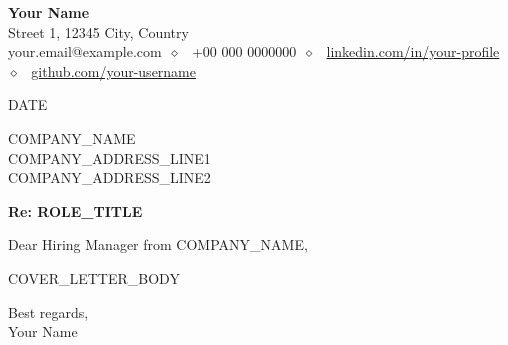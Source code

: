 \documentclass[11pt,a4paper]{article}
\makeatletter
\newif\ifplaincoverletter
\newcommand{\contactlink}[2]{\ifplaincoverletter #2\else\href{#1}{#2}\fi}
\newcommand{\candidatename}{Your Name}
\newcommand{\candidateaddress}{Street 1, 12345 City, Country}
\newcommand{\candidateemail}{your.email@example.com}
\newcommand{\candidatephone}{+00 000 0000000}
\newcommand{\candidatelinkedin}{linkedin.com/in/your-profile}
\newcommand{\candidategithub}{github.com/your-username}
\makeatother
\begin{document}
\begin{center}
{\Large\bfseries \candidatename}\\[2pt]
\candidateaddress\\
\candidateemail ~$\diamond$~ \candidatephone ~$\diamond$~ \contactlink{https://\candidatelinkedin}{\candidatelinkedin} ~$\diamond$~ \contactlink{https://\candidategithub}{\candidategithub}
\end{center}

\vspace{1.5em}

\noindent DATE

\vspace{1em}

\noindent COMPANY\_NAME\\
COMPANY\_ADDRESS\_LINE1\\
COMPANY\_ADDRESS\_LINE2

\vspace{1.5em}

\noindent \textbf{Re: ROLE\_TITLE}

\vspace{1em}

\noindent Dear Hiring Manager from COMPANY\_NAME,

\vspace{1em}

COVER\_LETTER\_BODY

\vspace{1.5em}

\noindent Best regards,\\
\candidatename
\end{document}
